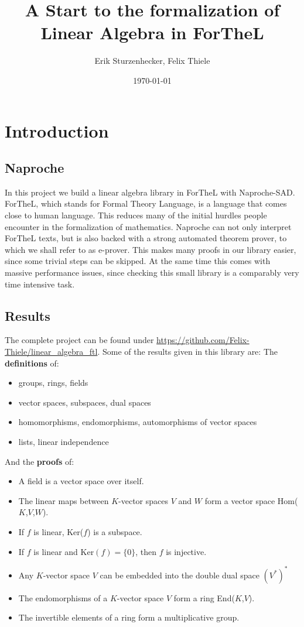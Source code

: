 \documentclass[11pt]{article}
\author{Erik Sturzenhecker, Felix Thiele}
\title{A Start to the formalization of Linear Algebra in ForTheL}
\date{\today}
\begin{document}
\maketitle
\newpage 
\setcounter{tocdepth}{10}
\tableofcontents

\newpage 
\section{Introduction}
\subsection{Naproche}
In this project we build a linear algebra library in ForTheL with Naproche-SAD. ForTheL, which stands for Formal Theory Language, is a language that comes close to human language.
This reduces many of the initial hurdles people encounter in the formalization of mathematics.
Naproche can not only interpret ForTheL texts, but is also backed with a strong automated theorem prover, to which we shall refer to as e-prover.
This makes many proofs in our library easier, since some trivial steps can be skipped.
At the same time this comes with massive performance issues, since checking this small library is a comparably very time intensive task.

\subsection{Results}
The complete project can be found under \url{https://github.com/Felix-Thiele/linear_algebra_ftl}.
Some of the results given in this library are:
\newline
The \textbf{definitions} of:
\begin{itemize}[nolistsep, noitemsep]
\item groups, rings, fields
\item vector spaces, subspaces, dual spaces
\item homomorphisms, endomorphisms, automorphisms of vector spaces
\item lists, linear independence
\end{itemize}
And the \textbf{proofs} of:
\begin{itemize}[nolistsep, noitemsep]
\item A field is a vector space over itself.
\item The linear maps between $K$-vector spaces $V$ and $W$ form a vector space Hom($K$,$V$,$W$).
\item If $f$ is linear, Ker($f$) is a subspace.
\item If $f$ is linear and Ker$(f)=\{0\}$, then $f$ is injective.
\item Any $K$-vector space $V$ can be embedded into the double dual space $(V^{*})^{*}$
\item The endomorphisms of a $K$-vector space $V$ form a ring End($K$,$V$).
\item The invertible elements of a ring form a multiplicative group.
\end{itemize}
\end{document}
